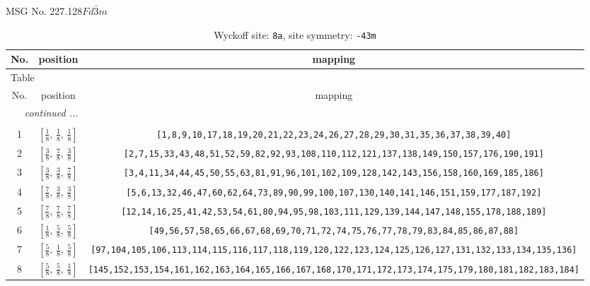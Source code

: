 \documentclass[fleqn,8pt]{jsarticle}
\begin{document}
\setcounter{MaxMatrixCols}{32}

\renewcommand{\tablename}{Table~}
\renewcommand{\figurename}{Figure~}
\begin{center}
\LARGE
MSG No. 227.128\quad$Fd\bar{3}m$
\end{center}
\renewcommand{\arraystretch}{1.2}
\begin{longtable}{ccc}
\caption{Wyckoff site: {\tt 8a}, site symmetry: {\tt -43m}}
 \\
 \hline \hline
No. & position & mapping \\ \hline \endfirsthead

\multicolumn{2}{l}{\tablename\ \thetable{}} \\
 \hline \hline
No. & position & mapping \\ \hline \endhead

 \hline \hline
\multicolumn{2}{r}{\footnotesize\it continued ...} \\ \endfoot

 \hline \hline
\multicolumn{2}{r}{} \\ \endlastfoot

1 & $\left[ \frac{1}{8},\, \frac{1}{8},\, \frac{1}{8} \right]$ & {\tt [1,8,9,10,17,18,19,20,21,22,23,24,26,27,28,29,30,31,35,36,37,38,39,40]} \\ \hline
2 & $\left[ \frac{3}{8},\, \frac{7}{8},\, \frac{3}{8} \right]$ & {\tt [2,7,15,33,43,48,51,52,59,82,92,93,108,110,112,121,137,138,149,150,157,176,190,191]} \\ \hline
3 & $\left[ \frac{3}{8},\, \frac{3}{8},\, \frac{7}{8} \right]$ & {\tt [3,4,11,34,44,45,50,55,63,81,91,96,101,102,109,128,142,143,156,158,160,169,185,186]} \\ \hline
4 & $\left[ \frac{7}{8},\, \frac{3}{8},\, \frac{3}{8} \right]$ & {\tt [5,6,13,32,46,47,60,62,64,73,89,90,99,100,107,130,140,141,146,151,159,177,187,192]} \\ \hline
5 & $\left[ \frac{7}{8},\, \frac{7}{8},\, \frac{7}{8} \right]$ & {\tt [12,14,16,25,41,42,53,54,61,80,94,95,98,103,111,129,139,144,147,148,155,178,188,189]} \\ \hline
6 & $\left[ \frac{1}{8},\, \frac{5}{8},\, \frac{5}{8} \right]$ & {\tt [49,56,57,58,65,66,67,68,69,70,71,72,74,75,76,77,78,79,83,84,85,86,87,88]} \\ \hline
7 & $\left[ \frac{5}{8},\, \frac{1}{8},\, \frac{5}{8} \right]$ & {\tt [97,104,105,106,113,114,115,116,117,118,119,120,122,123,124,125,126,127,131,132,133,134,135,136]} \\ \hline
8 & $\left[ \frac{5}{8},\, \frac{5}{8},\, \frac{1}{8} \right]$ & {\tt [145,152,153,154,161,162,163,164,165,166,167,168,170,171,172,173,174,175,179,180,181,182,183,184]} \\
\end{longtable}
\end{document}

